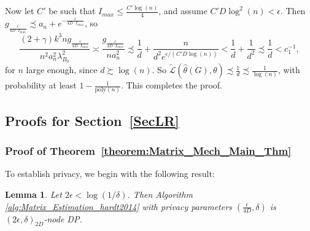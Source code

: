 \documentclass{article}
\newtheorem{lemma}{Lemma}
\newcommand{\thetahat}{\ensuremath{\widehat{\theta}}}
\begin{document}
Now let $C'$ be such that $I_{max} \leq \frac{C'\log(n)}{4}$, and assume $C'D\log^2(n) < \epsilon$. Then $g_{\frac{\epsilon}{4D\cdot I_{max}}} \precsim a_n + e^{-\frac{\epsilon}{4D\cdot I_{max}}}$, so
\begin{equation*}
\frac{(2 + \gamma)k^3ng_{\frac{\epsilon}{4D\cdot I_{max}}}}{n^2a_n^2\lambda_{B_0}^2} \asymp \frac{g_{\frac{\epsilon}{4D\cdot I_{max}}}}{na_n^2} \precsim \frac{1}{d} + \frac{n}{d^2e^{\epsilon/(C'D\log(n))}} < \frac{1}{d} + \frac{1}{d^2} \precsim \frac{1}{d} < c_1^{-1},
\end{equation*}
for $n$ large enough, since $d \succsim \log(n)$. So $\widetilde{\mathcal{L}}\left(\thetahat(G), \theta\right) \precsim \frac{1}{d} \precsim \frac{1}{\log(n)}$, with probability at least $1 - \frac{1}{\mathrm{poly}(n)}$. This completes the proof.


\subsection{Proofs for Section~\ref{SecLR}}
\label{AppLR}

\subsubsection{Proof of Theorem~\ref{theorem:Matrix_Mech_Main_Thm}}
\label{AppMatrixMech}



To establish privacy, we begin with the following result:
\begin{lemma}
\label{lemma:d_tight_priv}
Let $2\epsilon < \log(1/\delta)$. Then Algorithm \ref{alg:Matrix_Estimation_hardt2014} with privacy parameters $\left(\frac{\epsilon}{4D}, \delta\right)$ is $(2\epsilon, \delta)_{2D}$-node DP. 
\end{lemma}
\end{document}
